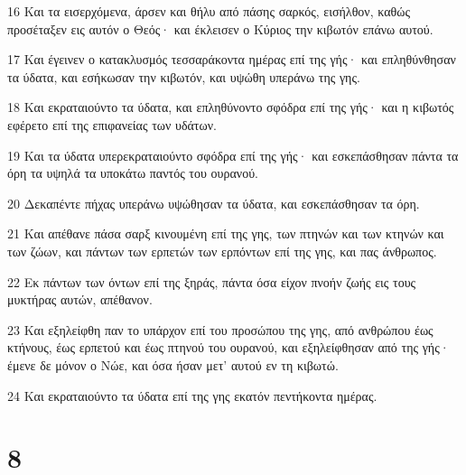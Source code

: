 \par 16 Και τα εισερχόμενα, άρσεν και θήλυ από πάσης σαρκός, εισήλθον, καθώς προσέταξεν εις αυτόν ο Θεός· και έκλεισεν ο Κύριος την κιβωτόν επάνω αυτού.
\par 17 Και έγεινεν ο κατακλυσμός τεσσαράκοντα ημέρας επί της γής· και επληθύνθησαν τα ύδατα, και εσήκωσαν την κιβωτόν, και υψώθη υπεράνω της γης.
\par 18 Και εκραταιούντο τα ύδατα, και επληθύνοντο σφόδρα επί της γής· και η κιβωτός εφέρετο επί της επιφανείας των υδάτων.
\par 19 Και τα ύδατα υπερεκραταιούντο σφόδρα επί της γής· και εσκεπάσθησαν πάντα τα όρη τα υψηλά τα υποκάτω παντός του ουρανού.
\par 20 Δεκαπέντε πήχας υπεράνω υψώθησαν τα ύδατα, και εσκεπάσθησαν τα όρη.
\par 21 Και απέθανε πάσα σαρξ κινουμένη επί της γης, των πτηνών και των κτηνών και των ζώων, και πάντων των ερπετών των ερπόντων επί της γης, και πας άνθρωπος.
\par 22 Εκ πάντων των όντων επί της ξηράς, πάντα όσα είχον πνοήν ζωής εις τους μυκτήρας αυτών, απέθανον.
\par 23 Και εξηλείφθη παν το υπάρχον επί του προσώπου της γης, από ανθρώπου έως κτήνους, έως ερπετού και έως πτηνού του ουρανού, και εξηλείφθησαν από της γής· έμενε δε μόνον ο Νώε, και όσα ήσαν μετ' αυτού εν τη κιβωτώ.
\par 24 Και εκραταιούντο τα ύδατα επί της γης εκατόν πεντήκοντα ημέρας.

\chapter{8}


